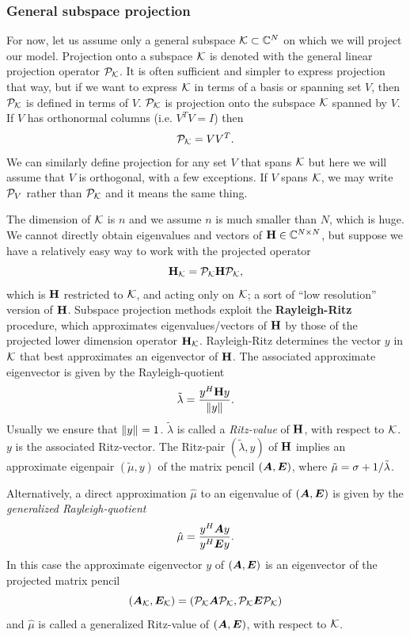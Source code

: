 \subsubsection{General subspace projection}
\label{sec:rayleigh_ritz}
For now, let us assume only a general subspace $\K \subset \C^N$ on which we will project our model. 
Projection onto a subspace $\K$ is denoted with the general linear projection operator $\P_\K$.    It is often sufficient and simpler to express projection that way, but if we want to express $\K$ in terms of a basis or spanning set $V$, then $\P_\K$ is defined in terms of $V$.  $\P_\K$ is  projection onto the subspace $\K$ spanned by $V$.  If $V$ has orthonormal columns (i.e. $V^TV = I$) then   
\begin{equation}
\P_\K =  VV^T.
\label{eq:projection_ortho}
\end{equation}
We can similarly define projection for any set $V$ that spans $\K$ but here we will assume that $V$ is orthogonal, with a few exceptions. If $V$ spans $\K$, we may write $\P_V$ rather than $\P_\K$ and it means the same thing.


The dimension of $\K$ is $n$ and we assume $n$ is much smaller than $N$, which is huge.  We cannot directly obtain eigenvalues and vectors of $\H\in\C^{N \times N}$, but suppose we have a relatively easy  way to work with the projected operator
\[
\H_\K = \Pk \H \Pk, 
\] 
which is $\H$ restricted to $\K$, and acting only on $\K$;  a sort of ``low resolution'' version of $\H$. 
\medskip
{}
 Subspace projection methods exploit the \textbf{Rayleigh-Ritz}  procedure, which approximates eigenvalues/vectors of $\H$ by those of the projected lower dimension operator $\H_\K$.  Rayleigh-Ritz determines the vector $y$ in $\K$ that best approximates  an eigenvector of $\H$.  The associated approximate eigenvector is given by the Rayleigh-quotient 
\begin{equation}
\tilde{\lambda} = \frac{\c{y} \H y}{\nrm{}{y}}.
\label{eq:rayleigh_quotient}
\end{equation}
Usually we ensure that $\nrm{}{y}=1$. $\tilde{\lambda}$ is called a \emph{Ritz-value} of $\H$, with respect to $\K$.  $y$ is the associated Ritz-vector. The Ritz-pair $(\tilde{\lambda},y)$ of $\H$ implies an approximate eigenpair $(\tilde{\mu},y)$ of the matrix pencil $(\A,\E)$, where $\tilde{\mu}=\xp+1/\tilde{\lambda}$. 

\smallskip
Alternatively, a direct approximation $\hat{\mu}$ to an eigenvalue of $(\A,\E)$ is given by the \emph{generalized Rayleigh-quotient}
\begin{equation}
\hat{\mu} = \frac{\c{y}\A y}{\c{y} \E y}.
\label{eq:generalized_rayleigh_quotient}
\end{equation}
In this case the approximate eigenvector $y$ of $(\A,\E)$ is an eigenvector of the projected matrix pencil 
\[
(\A_\K,\E_\K) = (\P_\K \A \P_\K, \P_\K \E \P_\K)
\]
and $\hat{\mu}$ is called a generalized Ritz-value of $(\A,\E)$, with respect to $\K$.  

